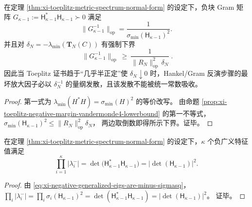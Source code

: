 \begin{proposition}\label{prop:xi-gramshift-illconditioning-forced-by-toeplitz-margin}
在定理 \ref{thm:xi-toeplitz-metric-spectrum-normal-form} 的设定下，负块 Gram 矩阵
\(
G_{\kappa-1}:=\mathsf H_{\kappa-1}^{\ast}\mathsf H_{\kappa-1}\succ 0
\)
满足
\[
\|G_{\kappa-1}^{-1}\|_{\mathrm{op}}=\frac{1}{\sigma_{\min}(\mathsf H_{\kappa-1})^2}.
\]
并且对 \(\delta_N=-\lambda_{\min}(\mathbf{T}_N(C))\) 有强制下界
\[
\boxed{\;
\|G_{\kappa-1}^{-1}\|_{\mathrm{op}}\ \ge\ \frac{1}{\|R_N\|_{\mathrm{op}}^{2}\,\delta_N}\; }.
\]
因此当 Toeplitz 证书趋于“几乎半正定”使 \(\delta_N\downarrow 0\) 时，Hankel/Gram 反演步骤的最坏放大因子必以 \(\delta_N^{-1}\) 的量纲发散，且该发散不能被统一常数吸收。
\end{proposition}
\begin{proof}
第一式为 \(\lambda_{\min}(H^{\ast}H)=\sigma_{\min}(H)^2\) 的等价改写。
由命题 \ref{prop:xi-toeplitz-negative-margin-vandermonde4-lowerbound} 的第一不等式，
\(
\sigma_{\min}(\mathsf H_{\kappa-1})^2\le \|R_N\|_{\mathrm{op}}^{2}\delta_N
\)，
两边取倒数即得所示下界。证毕。
\end{proof}

\begin{corollary}\label{cor:xi-negative-spectrum-product-dethankel-square}
在定理 \ref{thm:xi-toeplitz-metric-spectrum-normal-form} 的设定下，\(\kappa\) 个负广义特征值满足
\begin{equation}\label{eq:xi-product-negative-eigs-dethankel}
\prod_{i=1}^{\kappa}|\lambda_i^-|
=
\det\!\bigl(\mathsf H_{\kappa-1}^{\ast}\mathsf H_{\kappa-1}\bigr)
=
\bigl|\det(\mathsf H_{\kappa-1})\bigr|^2.
\end{equation}
\end{corollary}
\begin{proof}
由 \eqref{eq:xi-negative-generalized-eigs-are-minus-sigmasq}，
\(
\prod_i|\lambda_i^-|=\prod_i\sigma_i(\mathsf H_{\kappa-1})^2
=\det(\mathsf H_{\kappa-1}^{\ast}\mathsf H_{\kappa-1})
=|\det(\mathsf H_{\kappa-1})|^2
\)。
证毕。
\end{proof}

